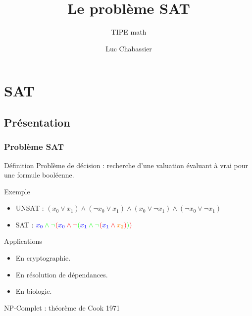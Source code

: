 \documentclass{beamer}
\title{Le problème SAT}
\subtitle{TIPE math}
\author{Luc Chabassier}
\institute{Lycée Pierre de Fermat}
\begin{document}
\begin{frame}
    \maketitle
\end{frame}

\section{SAT}
\subsection{Présentation}
\begin{frame}
    \frametitle{Problème SAT}
    \begin{block}{Définition}
        Problème de décision : recherche d'une valuation évaluant à vrai pour une formule booléenne.
    \end{block}

    \begin{exampleblock}{Exemple}
        \begin{itemize}
            \item UNSAT : $(x_0\vee x_1) \wedge (\neg x_0\vee x_1) \wedge (x_0\vee\neg x_1) \wedge (\neg x_0\vee\neg x_1)$
            \item SAT : ${\color{green}{\color{blue}x_0}\wedge\neg{\color{red}({\color{blue}x_0}\wedge\neg{\color{green}({\color{blue}x_1}\wedge\neg{\color{red}({\color{blue}x_1}\wedge {\color{orange}x_2})})})}}$
        \end{itemize}
    \end{exampleblock}
    \begin{exampleblock}{Applications}
        \begin{itemize}
            \item En cryptographie.
            \item En résolution de dépendances.
            \item En biologie.
        \end{itemize}
    \end{exampleblock}
    \begin{alertblock}{NP-Complet : théorème de Cook 1971}
    \end{alertblock}
\end{frame}
\end{document}
